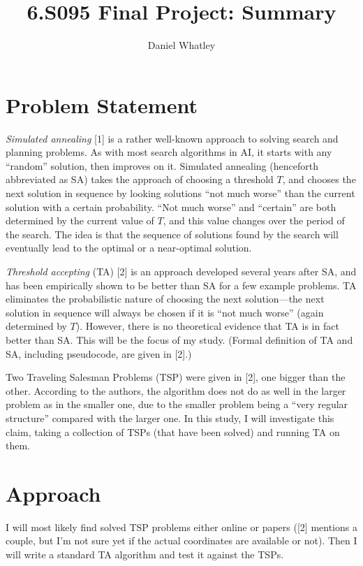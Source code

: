 \documentclass{article}
\title{6.S095 Final Project: Summary}
\author{Daniel Whatley}
\begin{document}
\maketitle

\section{Problem Statement}

\textit{Simulated annealing} [1] is a rather well-known approach to solving search and planning problems. As with most search algorithms in AI, it starts with any ``random'' solution, then improves on it. Simulated annealing (henceforth abbreviated as SA) takes the approach of choosing a threshold $T$, and chooses the next solution in sequence by looking solutions ``not much worse'' than the current solution with a certain probability. ``Not much worse'' and ``certain'' are both determined by the current value of $T$, and this value changes over the period of the search. The idea is that the sequence of solutions found by the search will eventually lead to the optimal or a near-optimal solution.

\textit{Threshold accepting} (TA) [2] is an approach developed several years after SA, and has been empirically shown to be better than SA for a few example problems. TA eliminates the probabilistic nature of choosing the next solution---the next solution in sequence will always be chosen if it is ``not much worse'' (again determined by $T$). However, there is no theoretical evidence that TA is in fact better than SA. This will be the focus of my study. (Formal definition of TA and SA, including pseudocode, are given in [2].)

Two Traveling Salesman Problems (TSP) were given in [2], one bigger than the other. According to the authors, the algorithm does not do as well in the larger problem as in the smaller one, due to the smaller problem being a ``very regular structure'' compared with the larger one. In this study, I will investigate this claim, taking a collection of TSPs (that have been solved) and running TA on them.

\section{Approach}

I will most likely find solved TSP problems either online or papers ([2] mentions a couple, but I'm not sure yet if the actual coordinates are available or not). Then I will write a standard TA algorithm and test it against the TSPs.
\end{document}
